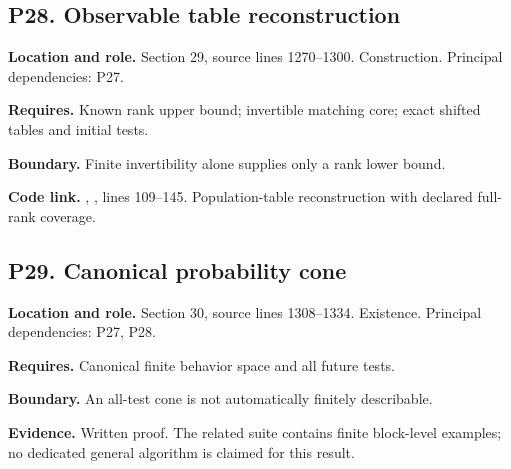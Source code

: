 \documentclass[11pt,oneside,openany]{book}
\numberwithin{equation}{section}
\begin{document}
\par\noindent\begin{minipage}{\textwidth}
\subsection{P28. Observable table
reconstruction}\label{LSMRegister:p28.-observable-table-reconstruction}

\textbf{Location and role.} Section 29, source lines 1270--1300.
Construction. Principal dependencies: P27.

\textbf{Requires.} Known rank upper bound; invertible matching core;
exact shifted tables and initial tests.

\textbf{Boundary.} Finite invertibility alone supplies only a rank lower
bound.

\textbf{Code link.} ,
, lines 109--145. Population-table reconstruction with
declared full-rank coverage.
\end{minipage}\par\medskip

\par\noindent\begin{minipage}{\textwidth}
\subsection{P29. Canonical probability
cone}\label{LSMRegister:p29.-canonical-probability-cone}

\textbf{Location and role.} Section 30, source lines 1308--1334.
Existence. Principal dependencies: P27, P28.

\textbf{Requires.} Canonical finite behavior space and all future tests.

\textbf{Boundary.} An all-test cone is not automatically finitely
describable.

\textbf{Evidence.} Written proof. The related suite contains finite
block-level examples; no dedicated general algorithm is claimed for this
result.
\end{minipage}\par\medskip
\end{document}
